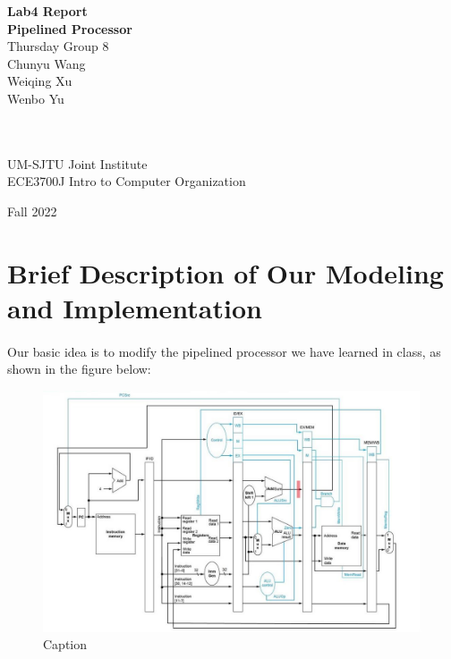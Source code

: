 \documentclass[a4paper]{article}
\begin{document}
 \begin{titlepage}
  \begin{center}
   \begin{spacing}{2.5}
   \textbf{\huge Lab4 Report}\\[0.5cm]
   \textbf{\Large Pipelined Processor}\\
   \vspace*{\fill}
   \textnormal{Thursday Group 8\\Chunyu Wang\\Weiqing Xu\\Wenbo Yu}
   \end{spacing}

   \begin{spacing}{1.5}
   \textbf{\large \\}
   \textbf{\large \\}
   \vspace*{\fill}
   \renewcommand{\baselinestretch}{1.5}
   \textnormal{\large UM-SJTU Joint Institute \\ ECE3700J Intro to Computer Organization\\}
   \end{spacing}
   
   \begin{spacing}{2.0}
   \textnormal{\large Fall 2022}
   \end{spacing}
  \end{center}
 \end{titlepage}

 \section{Brief Description of Our Modeling and Implementation}
 \paragraph{}Our basic idea is to modify the pipelined processor we have learned in class, as shown in the figure below:
 \begin{figure}[h]
     \centering
     \includegraphics[scale=0.6]{lab4_pp.jpg}
     \caption{Caption}
     \label{fig:1}
 \end{figure}
\end{document}
